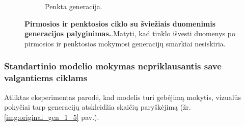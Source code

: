 \documentclass{VUMIFInfKursinis}
\begin{document}
\begin{figure}[H]
\begin{subfigure}[t]{0.45\textwidth}
        \caption{Penkta generacija.}
        \label{img:image2}
    \end{subfigure}
    \caption{\textbf{Pirmosios ir penktosios ciklo su šviežiais duomenimis generacijos palyginimas.}.Matyti, kad tinklo išvesti duomenys po pirmosios ir penktosios mokymosi generacijų smarkiai nesiskiria.}
    \label{img:fresh_gen_1_5}
\end{figure}


\subsubsection{Standartinio modelio mokymas nepriklausantis save valgantiems ciklams}

Atliktas eksperimentas parodė, kad modelis turi gebėjimą mokytis, vizualūs pokyčiai tarp generacijų atskleidžia skaičių paryškėjimą (žr. \ref{img:original_gen_1_5} pav.).
\end{document}
